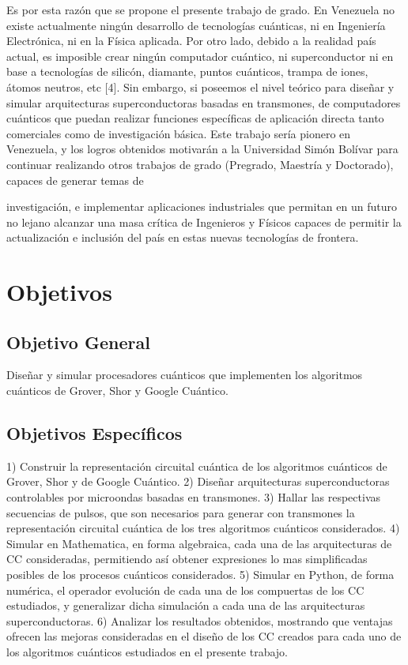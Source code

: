 Es por esta razón que se propone el presente trabajo de grado. En Venezuela no existe actualmente ningún desarrollo de tecnologías cuánticas, ni en Ingeniería Electrónica, ni en la Física aplicada. Por otro lado, debido a la realidad país actual, es imposible crear ningún computador cuántico, ni superconductor ni en base a tecnologías de silicón, diamante, puntos cuánticos, trampa de iones, átomos neutros, etc [4]. Sin embargo, si poseemos el nivel teórico para diseñar y simular arquitecturas superconductoras basadas en transmones, de computadores cuánticos que puedan realizar funciones específicas de aplicación directa tanto comerciales como de investigación básica.  Este trabajo sería pionero en Venezuela, y los logros obtenidos motivarán a la Universidad Simón Bolívar para continuar realizando otros trabajos de grado (Pregrado, Maestría y Doctorado), capaces de generar temas de

investigación, e implementar aplicaciones industriales que permitan en un futuro no lejano alcanzar una masa crítica de Ingenieros y Físicos capaces de permitir la actualización e inclusión del país en estas nuevas tecnologías de frontera.

\section{Objetivos}

\subsection{Objetivo General}

Diseñar y simular procesadores cuánticos que implementen los algoritmos cuánticos de Grover, Shor y Google Cuántico.

\subsection{Objetivos Específicos}

1) Construir la representación circuital cuántica de los algoritmos cuánticos de Grover, Shor y de Google Cuántico.
2) Diseñar arquitecturas superconductoras controlables por microondas basadas en transmones.
3) Hallar las respectivas secuencias de pulsos, que son necesarios para generar con transmones la
representación circuital cuántica de los tres algoritmos cuánticos considerados.
4) Simular en Mathematica, en forma algebraica, cada una de las arquitecturas de CC consideradas,
permitiendo así obtener expresiones lo mas simplificadas posibles de los procesos cuánticos considerados.
5) Simular en Python, de forma numérica, el operador evolución de cada una de los compuertas de los CC
estudiados, y generalizar dicha simulación a cada una de las arquitecturas superconductoras.
6) Analizar los resultados obtenidos, mostrando que ventajas ofrecen las mejoras consideradas en el
diseño de los CC creados para cada uno de los algoritmos cuánticos estudiados en el presente trabajo.

